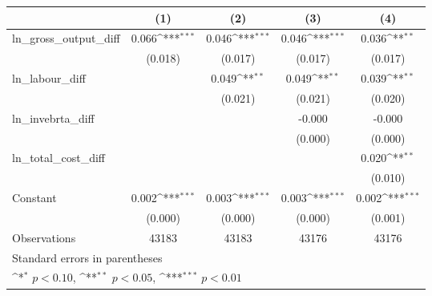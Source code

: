 {
\def\sym#1{\ifmmode^{#1}\else\(^{#1}\)\fi}
\begin{tabular}{l*{4}{c}}
\hline\hline
                &\multicolumn{1}{c}{(1)}         &\multicolumn{1}{c}{(2)}         &\multicolumn{1}{c}{(3)}         &\multicolumn{1}{c}{(4)}         \\
\hline
ln\_gross\_output\_diff&    0.066\sym{***}&    0.046\sym{***}&    0.046\sym{***}&    0.036\sym{**} \\
                &  (0.018)         &  (0.017)         &  (0.017)         &  (0.017)         \\
[1em]
ln\_labour\_diff  &                  &    0.049\sym{**} &    0.049\sym{**} &    0.039\sym{**} \\
                &                  &  (0.021)         &  (0.021)         &  (0.020)         \\
[1em]
ln\_invebrta\_diff&                  &                  &   -0.000         &   -0.000         \\
                &                  &                  &  (0.000)         &  (0.000)         \\
[1em]
ln\_total\_cost\_diff&                  &                  &                  &    0.020\sym{**} \\
                &                  &                  &                  &  (0.010)         \\
[1em]
Constant        &    0.002\sym{***}&    0.003\sym{***}&    0.003\sym{***}&    0.002\sym{***}\\
                &  (0.000)         &  (0.000)         &  (0.000)         &  (0.001)         \\
\hline
Observations    &    43183         &    43183         &    43176         &    43176         \\
\hline\hline
\multicolumn{5}{l}{\footnotesize Standard errors in parentheses}\\
\multicolumn{5}{l}{\footnotesize \sym{*} \(p<0.10\), \sym{**} \(p<0.05\), \sym{***} \(p<0.01\)}\\
\end{tabular}
}
